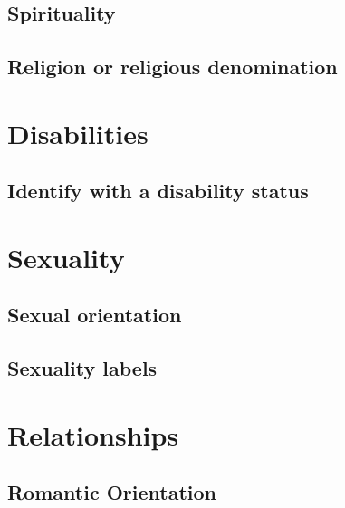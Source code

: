 \documentclass[
]{book}
\begin{document}
\hypertarget{spirituality-1}{%
\subsection{Spirituality}\label{spirituality-1}}

\hypertarget{religion-or-religious-denomination}{%
\subsection{Religion or religious denomination}\label{religion-or-religious-denomination}}

\hypertarget{disabilities}{%
\section{Disabilities}\label{disabilities}}

\hypertarget{identify-with-a-disability-status}{%
\subsection{Identify with a disability status}\label{identify-with-a-disability-status}}

\hypertarget{sexuality}{%
\section{Sexuality}\label{sexuality}}

\hypertarget{sexual-orientation}{%
\subsection{Sexual orientation}\label{sexual-orientation}}

\hypertarget{sexuality-labels}{%
\subsection{Sexuality labels}\label{sexuality-labels}}

\hypertarget{relationships}{%
\section{Relationships}\label{relationships}}

\hypertarget{romantic-orientation}{%
\subsection{Romantic Orientation}\label{romantic-orientation}}
\end{document}
